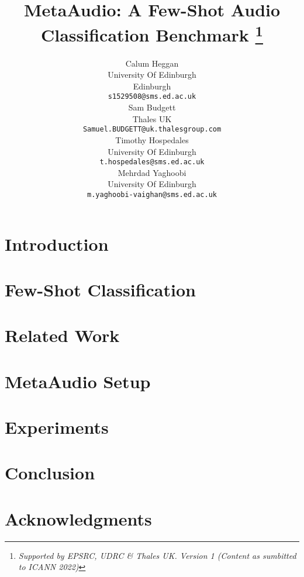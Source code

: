 \documentclass{article}
\title{MetaAudio: A Few-Shot Audio Classification Benchmark
\thanks{\textit{Supported by EPSRC, UDRC \& Thales UK. Version 1 (Content as sumbitted to ICANN 2022)}} 
}
\author{
  Calum Heggan\\
  University Of Edinburgh \\
  Edinburgh\\
  \texttt{{s1529508}@sms.ed.ac.uk} \\
\AND
   Sam Budgett \\
   Thales UK \\
   \texttt{Samuel.BUDGETT@uk.thalesgroup.com} \\
   \And
   Timothy Hospedales \\
   University Of Edinburgh \\
   \texttt{t.hospedales@sms.ed.ac.uk} \\
   \And
   Mehrdad Yaghoobi \\
   University Of Edinburgh\\
   \texttt{m.yaghoobi-vaighan@sms.ed.ac.uk} \\
}
\begin{document}
\maketitle






\section{Introduction}
\label{section:intro}


\section{Few-Shot Classification}
\label{section:few_shot_classification}


\section{Related Work}
\label{section:related_work}


\section{MetaAudio Setup}
\label{section:meta_audio_setup}


\section{Experiments}
\label{section:experiments}


\section{Conclusion}
\label{section:conclusion}


\section*{Acknowledgments}
\label{section:conclusion}


  
  
\end{document}
